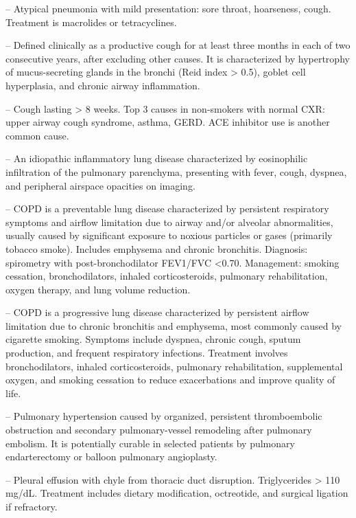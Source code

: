-- Atypical pneumonia with mild presentation: sore throat, hoarseness, cough. Treatment is macrolides or tetracyclines.

-- Defined clinically as a productive cough for at least three months in each of two consecutive years, after excluding other causes. It is characterized by hypertrophy of mucus-secreting glands in the bronchi (Reid index > 0.5), goblet cell hyperplasia, and chronic airway inflammation.

-- Cough lasting > 8 weeks. Top 3 causes in non-smokers with normal CXR: upper airway cough syndrome, asthma, GERD. ACE inhibitor use is another common cause.

-- An idiopathic inflammatory lung disease characterized by eosinophilic infiltration of the pulmonary parenchyma, presenting with fever, cough, dyspnea, and peripheral airspace opacities on imaging.

-- COPD is a preventable lung disease characterized by persistent respiratory symptoms and airflow limitation due to airway and/or alveolar abnormalities, usually caused by significant exposure to noxious particles or gases (primarily tobacco smoke). Includes emphysema and chronic bronchitis. Diagnosis: spirometry with post-bronchodilator FEV1/FVC <0.70. Management: smoking cessation, bronchodilators, inhaled corticosteroids, pulmonary rehabilitation, oxygen therapy, and lung volume reduction.

-- COPD is a progressive lung disease characterized by persistent airflow limitation due to chronic bronchitis and emphysema, most commonly caused by cigarette smoking. Symptoms include dyspnea, chronic cough, sputum production, and frequent respiratory infections. Treatment involves bronchodilators, inhaled corticosteroids, pulmonary rehabilitation, supplemental oxygen, and smoking cessation to reduce exacerbations and improve quality of life.

-- Pulmonary hypertension caused by organized, persistent thromboembolic obstruction and secondary pulmonary-vessel remodeling after pulmonary embolism. It is potentially curable in selected patients by pulmonary endarterectomy or balloon pulmonary angioplasty.

-- Pleural effusion with chyle from thoracic duct disruption. Triglycerides > 110 mg/dL. Treatment includes dietary modification, octreotide, and surgical ligation if refractory.


